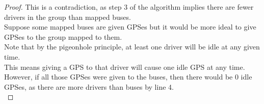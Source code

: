 \begin{problem}
\begin{proof}
        This is a contradiction, as step 3 of the algorithm implies there are fewer drivers in the group than mapped buses. \\
        Suppose some mapped buses are given GPSes but it would be more ideal to give GPSes to the group mapped to them. \\
        Note that by the pigeonhole principle, at least one driver will be idle at any given time. \\
        This means giving a GPS to that driver will cause one idle GPS at any time. \\
        However, if all those GPSes were given to the buses, then there would be 0 idle GPSes, as there are more drivers than buses by line 4. \\
    \end{proof}
\end{problem}
